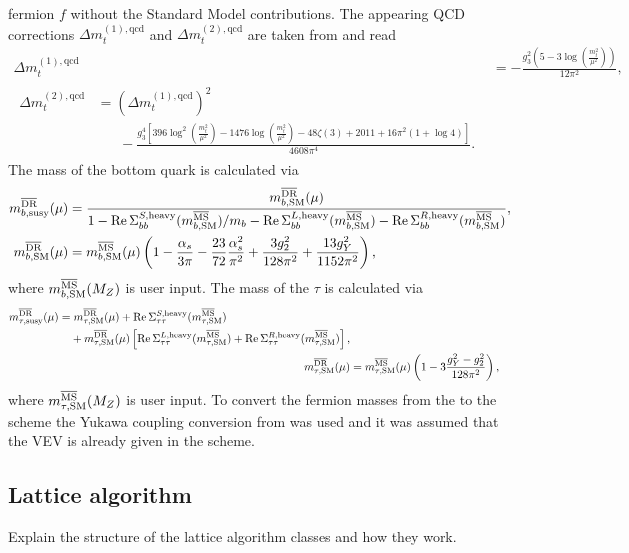 fermion $f$ without the Standard Model contributions.  The appearing
QCD corrections $\Delta m_t^{(1),\text{qcd}}$ and $\Delta
m_t^{(2),\text{qcd}}$ are taken from
\cite[Eq. (58),(61)]{Bednyakov:2002sf} and read
%
\begin{align}
  \Delta m_t^{(1),\text{qcd}} &= -\frac{g_3^2 \left(5-3 \log\left(\frac{m_t^2}{\mu^2}\right)\right)}{12 \pi^2},\\
  \begin{split}
    \Delta m_t^{(2),\text{qcd}} &= \left(\Delta
      m_t^{(1),\text{qcd}}\right)^2 \\
    &\phantom{=\;} - \frac{g_3^4 \left[396
        \log^2\left(\frac{m_t^2}{\mu^2}\right)-1476
        \log\left(\frac{m_t^2}{\mu^2}\right)-48 \zeta(3)+2011+16 \pi
        ^2 (1+\log 4)\right]}{4608 \pi^4}.
  \end{split}
\end{align}
%
The \DRbar mass of the bottom quark is calculated via
\cite{Baer:2002ek,Skands:2003cj}
%
\begin{align}
  m_{b,\text{susy}}^{\text{$\overline{\mbox{DR}}$}}(\mu) &=
  \frac{m_{b,\text{SM}}^{\text{$\overline{\mbox{DR}}$}}(\mu)}{1 -
    \operatorname{Re}\Sigma_{bb}^{S,\text{heavy}}(m_{b,\text{SM}}^\text{$\overline{\mbox{MS}}$})/m_b
    - \operatorname{Re}\Sigma_{bb}^{L,\text{heavy}}(m_{b,\text{SM}}^\text{$\overline{\mbox{MS}}$}) -
    \operatorname{Re}\Sigma_{bb}^{R,\text{heavy}}(m_{b,\text{SM}}^\text{$\overline{\mbox{MS}}$})} ,\\
  m_{b,\text{SM}}^{\text{$\overline{\mbox{DR}}$}}(\mu) &=
  m_{b,\text{SM}}^{\text{$\overline{\mbox{MS}}$}}(\mu) \left(1 - \frac{\alpha_s}{3
      \pi} - \frac{23}{72} \frac{\alpha_s^2}{\pi^2} + \frac{3
      g_2^2}{128 \pi^2} + \frac{13 g_Y^2}{1152 \pi^2}\right) ,
\end{align}
%
where $m_{b,\text{SM}}^{\text{$\overline{\mbox{MS}}$}}(M_Z)$ is user input.  The
\DRbar mass of the $\tau$ is calculated via
%
\begin{align}
  \begin{split}
    m_{\tau,\text{susy}}^{\text{$\overline{\mbox{DR}}$}}(\mu) &=
    m_{\tau,\text{SM}}^{\text{$\overline{\mbox{DR}}$}}(\mu) +
    \operatorname{Re}\Sigma_{\tau\tau}^{S,\text{heavy}}(m_{\tau,\text{SM}}^\text{$\overline{\mbox{MS}}$}) \\
    &\phantom{=\;} + m_{\tau,\text{SM}}^{\text{$\overline{\mbox{DR}}$}}(\mu) \left[
      \operatorname{Re}\Sigma_{\tau\tau}^{L,\text{heavy}}(m_{\tau,\text{SM}}^\text{$\overline{\mbox{MS}}$})
      +
      \operatorname{Re}\Sigma_{\tau\tau}^{R,\text{heavy}}(m_{\tau,\text{SM}}^\text{$\overline{\mbox{MS}}$})
    \right] ,
  \end{split}\\
  m_{\tau,\text{SM}}^{\text{$\overline{\mbox{DR}}$}}(\mu) &= m_{\tau,\text{SM}}^{\text{$\overline{\mbox{MS}}$}}(\mu)
  \left(1 - 3 \frac{g_Y^2 - g_2^2}{128 \pi^2}\right),
\end{align}
%
where $m_{\tau,\text{SM}}^{\text{$\overline{\mbox{MS}}$}}(M_Z)$ is user input.  To
convert the fermion masses from the \MSbar to the \DRbar scheme the
Yukawa coupling conversion from \cite[Eq.~(19)]{Skands:2003cj} was
used and it was assumed that the VEV is already given in the \DRbar
scheme.

\subsection{Lattice algorithm}

Explain the structure of the lattice algorithm classes and how they
work.
